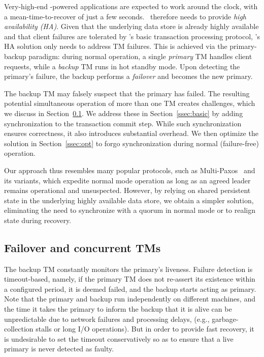 

Very-high-end \sys-powered applications are expected to work around the clock, with a mean-time-to-recover of just a few seconds. \sys\ therefore needs to provide \emph{high availability (HA)}. 
Given that the underlying  data store is already highly available
and that client failures are tolerated by \sys's basic transaction processing protocol, 
\sys's HA solution only needs to address TM failures.
This is achieved via the primary-backup paradigm: during normal operation, a single \emph{primary} TM handles client requests, while a \emph{backup} TM runs in hot standby mode.
Upon detecting the primary's failure, the backup performs a \emph{failover} and becomes the new primary. 

The backup TM may falsely suspect that the primary has failed.
The resulting potential simultaneous operation of more than one TM creates challenges, which we discuss in 
Section~\ref{ssec:failover}. We address these in Section~\ref{ssec:basic} 
by adding synchronization to the transaction commit step. While such synchronization ensures correctness, it also introduces substantial overhead. We then optimize the solution in Section~\ref{ssec:opt}
to forgo synchronization during normal (failure-free) operation.

Our approach thus resembles 
many popular protocols, such as Multi-Paxos~\cite{Lamport:1998:PP:279227.279229} and its variants, which expedite normal mode operation as long as an agreed leader remains operational and unsuspected. However, by relying on shared persistent state in the underlying highly available data store, we obtain a simpler solution, eliminating the need to synchronize with a quorum in normal mode or to realign state during recovery.


\subsection{Failover and concurrent TMs} 
\label{ssec:failover}

The backup TM constantly monitors the primary's liveness.
Failure detection is timeout-based, namely, if the primary TM does not re-assert its existence within a configured period, it is deemed failed, and the backup starts acting as primary.  
Note that the primary and backup run independently on different machines, and the time it takes the primary to inform the backup that it is alive can be unpredictable due to network failures and processing delays, (e.g., garbage-collection stalls or long I/O operations). But in order to provide fast recovery, it is undesirable to set the timeout conservatively so as to ensure that a live primary is never detected as faulty.

